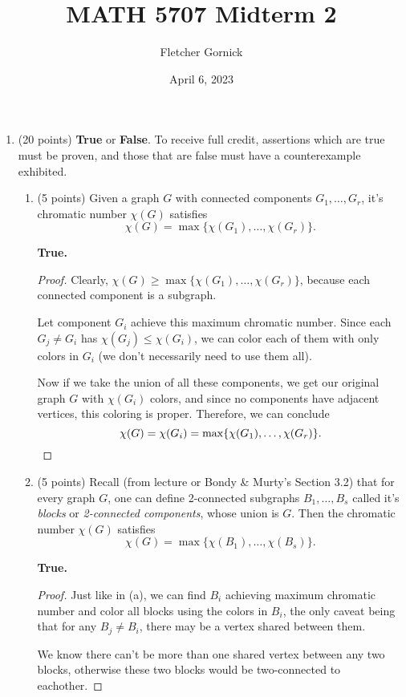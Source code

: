\documentclass[11pt]{article}
\title{\vspace{-1.0cm}MATH 5707 Midterm 2}
\author{Fletcher Gornick}
\date{April 6, 2023}
\newcommand{\n}{\vspace{0.3cm}}
\begin{document}
\maketitle
  \begin{enumerate}
    \item (20 points) \textbf{True} or \textbf{False}.  To receive full credit, assertions which are true must be proven, and those that are false must have a counterexample exhibited.
      \begin{enumerate}[label=(\alph*)]
        \item (5 points) Given a graph \(G\) with connected components \(G_1, \hdots, G_r\), it's chromatic number \(\chi(G)\) satisfies 
          \[\chi(G) = \max \{\chi(G_1), \hdots, \chi(G_r)\}.\]

          \textbf{True.}
          \begin{proof}
            Clearly, \(\chi(G) \geq \max \{\chi(G_1), \hdots, \chi(G_r)\}\), because each connected component is a subgraph. \n

            Let component \(G_i\) achieve this maximum chromatic number.  Since each \(G_j \neq G_i\) has \(\chi(G_j) \leq \chi(G_i)\), we can color each of them with only colors in \(G_i\) (we don't necessarily need to use them all). \n

            Now if we take the union of all these components, we get our original graph \(G\) with \(\chi(G_i)\) colors, and since no components have adjacent vertices, this coloring is proper.  Therefore, we can conclude 
            \[\chi(G) = \chi(G_i) = \max \{\chi(G_1), \hdots, \chi(G_r)\}. \qedhere\]
          \end{proof} \n
          

        \item (5 points) Recall (from lecture or Bondy \& Murty’s Section 3.2) that for every graph \(G\), one can define 2-connected subgraphs \(B_1, \hdots, B_s\) called it's \textit{blocks} or \textit{2-connected components}, whose union is \(G\).  Then the chromatic number \(\chi(G)\) satisfies
          \[\chi(G) = \max \{\chi(B_1), \hdots, \chi(B_s)\}.\]

          \textbf{True.}
          \begin{proof}
            Just like in (a), we can find \(B_i\) achieving maximum chromatic number and color all blocks using the colors in \(B_i\), the only caveat being that for any \(B_j \neq B_i\), there may be a vertex shared between them. \n

            We know there can't be more than one shared vertex between any two blocks, otherwise these two blocks would be two-connected to eachother. \n


\end{proof}
\end{enumerate}
\end{enumerate}
\end{document}
